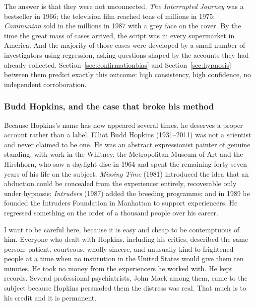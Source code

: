 The answer is that they were not unconnected. \emph{The Interrupted Journey} was a bestseller
in 1966; the television film reached tens of millions in 1975; \emph{Communion} sold in the
millions in 1987 with a grey face on the cover. By the time the great mass of cases arrived,
the script was in every supermarket in America. And the majority of those cases were developed
by a small number of investigators using regression, asking questions shaped by the accounts
they had already collected. Section~\ref{sec:confirmationbias} and Section~\ref{sec:hypnosis} between them predict
exactly this outcome: high consistency, high confidence, no independent corroboration.

\subsubsection*{Budd Hopkins, and the case that broke his method}

Because Hopkins's name has now appeared several times, he deserves a proper account rather than
a label. Elliot Budd Hopkins (1931--2011) was not a scientist and never claimed to be one. He
was an abstract expressionist painter of genuine standing, with work in the Whitney, the
Metropolitan Museum of Art and the Hirshhorn, who saw a daylight disc in 1964 and spent the
remaining forty-seven years of his life on the subject. \emph{Missing Time} (1981) introduced
the idea that an abduction could be concealed from the experiencer entirely, recoverable only
under hypnosis; \emph{Intruders} (1987) added the breeding programme; and in 1989 he founded
the Intruders Foundation in Manhattan to support experiencers. He regressed something on the
order of a thousand people over his career.

I want to be careful here, because it is easy and cheap to be contemptuous of him. Everyone who
dealt with Hopkins, including his critics, described the same person: patient, courteous, wholly
sincere, and unusually kind to frightened people at a time when no institution in the United
States would give them ten minutes. He took no money from the experiencers he worked with. He
kept records. Several professional psychiatrists, John Mack among them, came to the subject
because Hopkins persuaded them the distress was real. That much is to his credit and it is
permanent.

